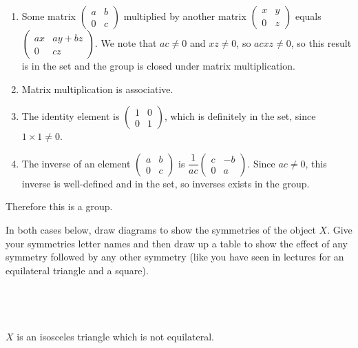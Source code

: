 \documentclass[a4paper]{article}
\begin{document}
\begin{enumerate}
	\item Some matrix $\begin{pmatrix}a & b\\ 0 & c\end{pmatrix}$ multiplied by another matrix $\begin{pmatrix}x & y\\ 0 & z\end{pmatrix}$ equals $\begin{pmatrix}ax & ay + bz\\ 0 & cz\end{pmatrix}$. We note that $ac \ne 0$ and $xz \ne 0$, so $acxz \ne 0$, so this result is in the set and the group is closed under matrix multiplication.
	\item Matrix multiplication is associative.
	\item The identity element is $\begin{pmatrix}1 & 0\\ 0 & 1\end{pmatrix}$, which is definitely in the set, since $1 \times 1 \ne 0$.
	\item The inverse of an element $\begin{pmatrix}a & b\\ 0 & c\end{pmatrix}$ is $\dfrac1{ac} \begin{pmatrix}c & -b\\ 0 & a\end{pmatrix}$. Since $ac \ne 0$, this inverse is well-defined and in the set, so inverses exists in the group.
\end{enumerate}

Therefore this is a group.


\begin{questionbody}
In both cases below, draw diagrams to show the symmetries of the object $X$. Give your symmetries letter names and then draw up a table to show the effect of any symmetry followed by any other symmetry (like you have seen in lectures for an equilateral triangle and a square).
\end{questionbody}

\subsection{~} %

\begin{questionbody}
$X$ is an isosceles triangle which is not equilateral.
\end{questionbody}
\end{document}
